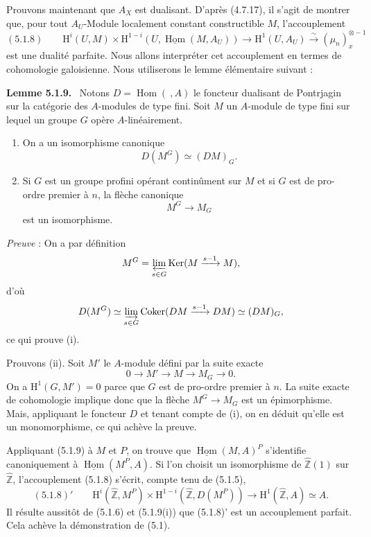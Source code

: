 \documentclass[11pt]{article}
\newenvironment{statement}[1]{\par\medskip\noindent\textbf{#1.}\ }{\par\medskip}
\renewcommand{\H}{\mathrm{H}}
\DeclareMathOperator{\Hom}{Hom}
\newcommand{\Z}{\mathbb{Z}}
\providecommand{\Ker}{\operatorname{Ker}}
\providecommand{\Coker}{\operatorname{Coker}}
\providecommand{\uHom}{\underline{\Hom}}
\providecommand{\Hom}{\operatorname{Hom}}
\providecommand{\Ker}{\operatorname{Ker}}
\providecommand{\Coker}{\operatorname{Coker}}
\providecommand{\Ker}{\operatorname{Ker}}
\providecommand{\Coker}{\operatorname{Coker}}
\providecommand{\Z}{\mathbb Z}
\providecommand{\Hom}{\operatorname{Hom}}
\begin{document}
Prouvons maintenant que $A_X$ est dualisant. D'après (4.7.17), il s'agit de montrer que, pour tout $A_U$-Module localement constant constructible $M$, l'accouplement
\[
(5.1.8)\qquad \H^i(U,M)\times\H^{1-i}(U,\uHom(M,A_U))\longrightarrow \H^1(U,A_U)\xrightarrow{\sim}(\mu_n)_x^{\otimes -1}%
\]
est une dualité parfaite. Nous allons interpréter cet accouplement en termes de cohomologie galoisienne. Nous utiliserons le lemme élémentaire suivant :

\begin{statement}{Lemme 5.1.9}
Notons $D=\Hom(\ ,A)$ le foncteur dualisant de Pontrjagin sur la catégorie des $A$-modules de type fini. Soit $M$ un $A$-module de type fini sur lequel un groupe $G$ opère $A$-linéairement.
\begin{enumerate}[label=(\roman*)]
\item On a un isomorphisme canonique
\[
D(M^G)\simeq (DM)_G.
\]
\item Si $G$ est un groupe profini opérant continûment sur $M$ et si $G$ est de pro-ordre premier à $n$, la flèche canonique
\[
M^G\longrightarrow M_G
\]
est un isomorphisme.
\end{enumerate}
\end{statement}

\emph{Preuve} : On a par définition
\[
M^G=\varprojlim_{s\in G}\Ker(M\xrightarrow{s-1}M),
\]
d'où
\[
D(M^G)\simeq \varinjlim_{s\in G}\Coker(DM\xrightarrow{s-1}DM)\simeq (DM)_G,
\]
ce qui prouve (i).

Prouvons (ii). Soit $M'$ le $A$-module défini par la suite exacte
\[
0\longrightarrow M'\longrightarrow M\longrightarrow M_G\longrightarrow0.
\]
On a $\H^1(G,M')=0$ parce que $G$ est de pro-ordre premier à $n$. La suite exacte de cohomologie implique donc que la flèche $M^G\to M_G$ est un épimorphisme. Mais, appliquant le foncteur $D$ et tenant compte de (i), on en déduit qu'elle est un monomorphisme, ce qui achève la preuve.

Appliquant (5.1.9) à $M$ et $P$, on trouve que $\uHom(M,A)^P$ s'identifie canoniquement à $\uHom(M^P,A)$. Si l'on choisit un isomorphisme de $\widehat{\Z}(1)$ sur $\widehat{\Z}$, l'accouplement (5.1.8) s'écrit, compte tenu de (5.1.5),
\[
(5.1.8)'\qquad \H^i(\widehat{\Z},M^P)\times\H^{1-i}(\widehat{\Z},D(M^P))\longrightarrow\H^1(\widehat{\Z},A)\simeq A.
\]
Il résulte aussitôt de (5.1.6) et (5.1.9(i)) que (5.1.8)' est un accouplement parfait. Cela achève la démonstration de (5.1).
\end{document}
